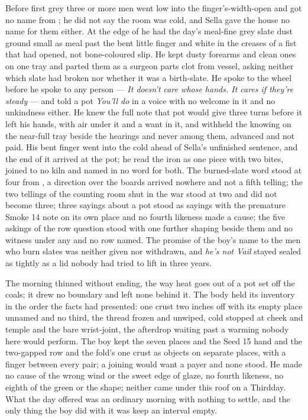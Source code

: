 Before first grey three or more men went low into the finger's-width-open  and got no name from ; he did not say the room was cold, and Sella gave the house no name for them either. At the edge of  he had the day's meal-fine grey slate dust ground small as meal past the bent little finger and white in the creases of a fist that had opened, not bone-coloured slip. He kept dusty forearms and clean ones on one tray and parted them as a surgeon parts clot from vessel, asking neither which slate had broken nor whether it was a birth-slate. He spoke to the wheel before he spoke to any person --- \emph{It doesn't care whose hands. It cares if they're steady} --- and told a pot \emph{You'll do} in a voice with no welcome in it and no unkindness either. He knew the full note that pot would give three turns before it left his hands, with air under it and a want in it, and withheld the knowing on the near-full tray beside the hearings and never among them, advanced and not paid. His bent finger went into the cold  ahead of Sella's unfinished sentence, and the end of it arrived at the pot; he read the iron as one piece with two bites, joined to no kiln and named in no  word for both. The burned-slate word stood at four from , a direction over the boards arrived nowhere and not a fifth telling; the two tellings of the counting room shut in the war stood at two and did not become three; three sayings about a pot stood as sayings with the premature Smoke 14 note on its own place and no fourth likeness made a cause; the five askings of the row question stood with one further shaping beside them and no witness under any and no row named. The promise of the boy's name to the men who burn slates was neither given nor withdrawn, and \emph{he's not Vail} stayed sealed as tightly as a lid nobody had tried to lift in three years.

\scenebreak

The morning thinned without ending, the way heat goes out of a pot set off the coals; it drew no boundary and left none behind it. The body held its inventory in the order the facts had presented: one crust two inches off with its empty place unnamed and no third, the thread frozen and unwiped, cold stopped at cheek and temple and the bare wrist-joint, the afterdrop waiting past a warming nobody here would perform. The boy kept the seven places and the Seed 15 hand and the two-gapped row and the fold's one crust as objects on separate places, with a finger between every pair; a joining would want a payer and none stood. He made no cause of the wrong wind or the sweet edge of glaze, no fourth likeness, no eighth of the green or the shape; neither came under this roof on a Thirdday. What the day offered was an ordinary morning with nothing to settle, and the only thing the boy did with it was keep an interval empty.

